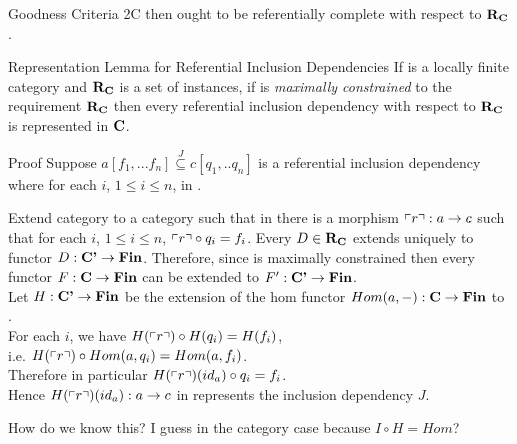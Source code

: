 \begin{frame}{Goodness Criteria 2C}
 \IfSforCwithRCwords 
then \catcw ought to be referentially complete with respect to $\textbf{R}_{\textbf{C}}$.
\end{frame}

\begin{frame}{Representation Lemma for Referential Inclusion Dependencies}
If \catcw is a locally finite category and $\textbf{R}_{\textbf{C}}$ is a set of instances, if \catcw is 
\textit{maximally constrained} to the requirement $\textbf{R}_{\textbf{C}}$ then
every referential inclusion dependency with respect to $\textbf{R}_{\textbf{C}}$ is represented in $\textbf{C}$.
\end{frame}

\begin{frame}{Proof}
Suppose $a[f_1,...f_n] \overset{J}{\subseteq} c[q_1,..q_n]$ is a referential inclusion dependency
where for each $i$, $1 \leq i \leq n$,
\scalebox{0.9}{\incdsetup} in \catc.

Extend category \catcw to a category \catcpw such that in \catcpw there is
a morphism $\left\ulcorner r\right\urcorner: a \rightarrow c$ such that for each $i$, $1 \leq i \leq n$, 
$\left\ulcorner r\right\urcorner \circ q_i = f_i$.
Every $D \in \textbf{R}_{\textbf{C}}$ extends uniquely to functor $D: \textbf{C'} \rightarrow \textbf{Fin}$. Therefore, since \catcw is maximally constrained then every functor $F: \textbf{C} \rightarrow \textbf{Fin}$ can be extended to $F':\textbf{C'} \rightarrow \textbf{Fin}$. \\
\pause Let $H: \textbf{C'} \rightarrow \textbf{Fin}$ be the extension of the hom functor $Hom(a,-): \textbf{C} \rightarrow \textbf{Fin}$ to 
\catcp. \\
\pause For each $i$, we have $H(\left\ulcorner r\right\urcorner) \circ H(q_i) = H(f_i)$, \\
\pause \hspace {3cm} i.e. $H(\left\ulcorner r\right\urcorner) \circ Hom(a,q_i) = Hom(a,f_i)$. \\
\pause Therefore in particular $H(\left\ulcorner r\right\urcorner)(id_a) \circ q_i =  f_i$. \\
\pause Hence $H(\left\ulcorner r\right\urcorner)(id_a):a \rightarrow c$ in \catcw represents the inclusion dependency $J$.

 How do we know this?
I guess in the category case because $I \circ H = Hom$? 
\end{frame}

